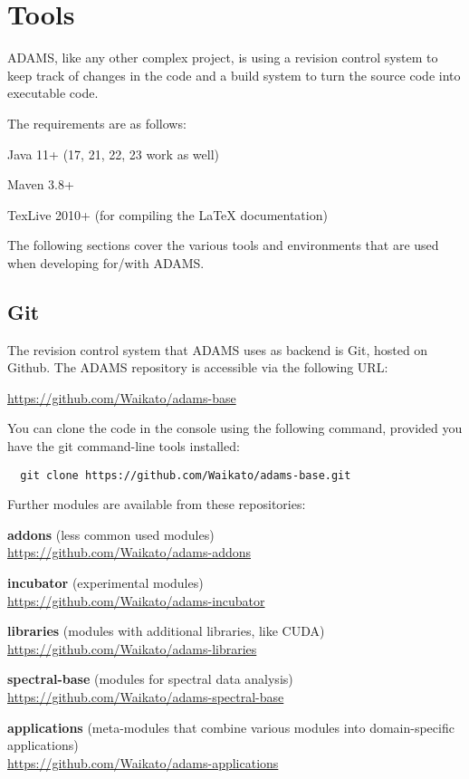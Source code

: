 \chapter{Tools}
ADAMS, like any other complex project, is using a revision control system to
keep track of changes in the code and a build system to turn the source code
into executable code.

The requirements are as follows:
\begin{tight_itemize}
  \item Java 11+ (17, 21, 22, 23 work as well)
  \item Maven 3.8+
  \item TexLive 2010+ (for compiling the LaTeX documentation)
\end{tight_itemize}

The following sections cover the various tools and environments that are
used when developing for/with ADAMS.

\section{Git}
The revision control system that ADAMS uses as backend is Git\cite{git},
hosted on Github\cite{github}. The ADAMS repository is accessible via the
following URL:

\url{https://github.com/Waikato/adams-base}{}

\noindent You can clone the code in the console using the following
command, provided you have the git command-line tools installed:
\begin{verbatim}
  git clone https://github.com/Waikato/adams-base.git
\end{verbatim}

Further modules are available from these repositories:
\begin{tight_itemize}
	\item \textbf{addons} (less common used modules) \\
	\url{https://github.com/Waikato/adams-addons}{}
	\item \textbf{incubator} (experimental modules) \\
	\url{https://github.com/Waikato/adams-incubator}{}
	\item \textbf{libraries} (modules with additional libraries, like CUDA) \\
	\url{https://github.com/Waikato/adams-libraries}{}
	\item \textbf{spectral-base} (modules for spectral data analysis) \\
	\url{https://github.com/Waikato/adams-spectral-base}{}
	\item \textbf{applications} (meta-modules that combine various modules into domain-specific applications) \\
	\url{https://github.com/Waikato/adams-applications}{}
\end{tight_itemize}

